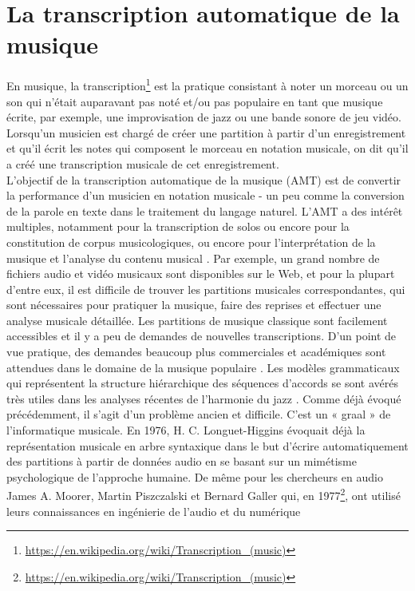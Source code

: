 \section{La transcription automatique de la musique}
En musique, la transcription\footnote{\url{
https://en.wikipedia.org/wiki/Transcription_(music)}} est la pratique
consistant à noter un morceau ou un son qui n'était auparavant pas noté et/ou
pas populaire en tant que musique écrite, par exemple, une improvisation de
jazz ou une bande sonore de jeu vidéo. Lorsqu'un musicien est chargé de créer
une partition à partir d'un enregistrement et qu'il écrit les notes qui
composent le morceau en notation musicale, on dit qu'il a créé une
transcription musicale de cet enregistrement.\\
L'objectif de la transcription automatique de la musique (AMT)
\cite{future_directions} est de convertir la performance d'un musicien en
notation musicale - un peu comme la conversion de la parole en texte dans le
traitement du langage naturel. L’AMT a des intérêt multiples, notamment pour la
transcription de solos ou encore pour la constitution de corpus musicologiques,
ou encore pour l'interprétation de la musique et l'analyse du contenu musical
\cite{SHIBATA2021262}. Par exemple, un grand nombre de fichiers audio et vidéo
musicaux sont disponibles sur le Web, et pour la plupart d'entre eux, il est
difficile de trouver les partitions musicales correspondantes, qui sont
nécessaires pour pratiquer la musique, faire des reprises et effectuer une
analyse musicale détaillée. Les partitions de musique classique sont facilement
accessibles et il y a peu de demandes de nouvelles transcriptions. D'un point
de vue pratique, des demandes beaucoup plus commerciales et académiques sont
attendues dans le domaine de la musique populaire \cite{SHIBATA2021262}. Les
modèles grammaticaux qui représentent la structure hiérarchique des séquences
d'accords se sont avérés très utiles dans les analyses récentes de l'harmonie
du jazz \cite{harasimjazz}.
Comme déjà évoqué précédemment, il s’agit d’un problème ancien et difficile.
C’est un « graal » de l’informatique musicale. En 1976, H. C. Longuet-Higgins
\cite{first_one} évoquait déjà la représentation musicale en arbre syntaxique
dans le but d’écrire automatiquement des partitions à partir de données audio
en se basant sur un mimétisme psychologique de l’approche humaine. De même pour
les chercheurs en audio James A. Moorer, Martin Piszczalski et Bernard Galler
qui, en 1977\footnote{\url{https://en.wikipedia.org/wiki/Transcription_(music)}
}, ont utilisé leurs connaissances en ingénierie de l’audio et du numérique
